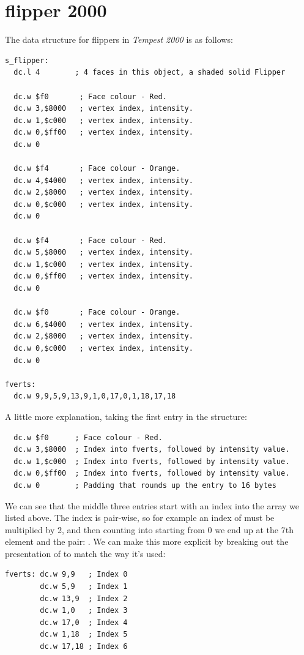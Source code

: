 \chapter{flipper 2000}
\lhead[tempest 2000]{}
\label{sec:listing}
\lstset{style=68KStyle}

The data structure for flippers in \textit{Tempest 2000} is as follows:

\begin{lstlisting}
s_flipper: 
  dc.l 4        ; 4 faces in this object, a shaded solid Flipper
    
  dc.w $f0       ; Face colour - Red.
  dc.w 3,$8000   ; vertex index, intensity.
  dc.w 1,$c000   ; vertex index, intensity.
  dc.w 0,$ff00   ; vertex index, intensity.
  dc.w 0
    
  dc.w $f4       ; Face colour - Orange.
  dc.w 4,$4000   ; vertex index, intensity.
  dc.w 2,$8000   ; vertex index, intensity.
  dc.w 0,$c000   ; vertex index, intensity.
  dc.w 0
    
  dc.w $f4       ; Face colour - Red.
  dc.w 5,$8000   ; vertex index, intensity.
  dc.w 1,$c000   ; vertex index, intensity.
  dc.w 0,$ff00   ; vertex index, intensity.
  dc.w 0
    
  dc.w $f0       ; Face colour - Orange.
  dc.w 6,$4000   ; vertex index, intensity.
  dc.w 2,$8000   ; vertex index, intensity.
  dc.w 0,$c000   ; vertex index, intensity.
  dc.w 0

fverts:
  dc.w 9,9,5,9,13,9,1,0,17,0,1,18,17,18
\end{lstlisting}

A little more explanation, taking the first entry in the structure:
\begin{lstlisting}
  dc.w $f0      ; Face colour - Red.
  dc.w 3,$8000  ; Index into fverts, followed by intensity value.
  dc.w 1,$c000  ; Index into fverts, followed by intensity value.
  dc.w 0,$ff00  ; Index into fverts, followed by intensity value.
  dc.w 0        ; Padding that rounds up the entry to 16 bytes
\end{lstlisting}

We can see that the middle three entries start with an index into the array  we listed above.
The index is pair-wise, so for example an index of  must be multiplied by 2, and then counting into 
starting from 0 we end up at the 7th element and the pair: . We can make this more explicit by breaking out the
presentation of  to match the way it's used:
\begin{lstlisting}
fverts: dc.w 9,9   ; Index 0
        dc.w 5,9   ; Index 1
        dc.w 13,9  ; Index 2
        dc.w 1,0   ; Index 3
        dc.w 17,0  ; Index 4
        dc.w 1,18  ; Index 5
        dc.w 17,18 ; Index 6
\end{lstlisting}

